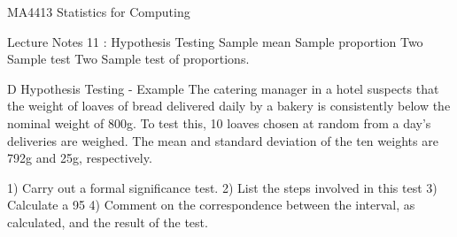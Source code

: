MA4413 Statistics for Computing
 
Lecture Notes 11 : Hypothesis Testing
Sample mean
Sample proportion
Two Sample test
Two Sample test of proportions. 

D Hypothesis Testing - Example
The catering manager in a hotel suspects that the weight of loaves of bread delivered
daily by a bakery is consistently below the nominal weight of 800g. To test this,
10 loaves chosen at random from a day’s deliveries are weighed. The mean and
standard deviation of the ten weights are 792g and 25g, respectively.
 
1) Carry out a formal significance test.
2) List the steps involved in this test 
3) Calculate a 95%
4) Comment on the correspondence between the interval, as calculated, and the
    result of the test.
